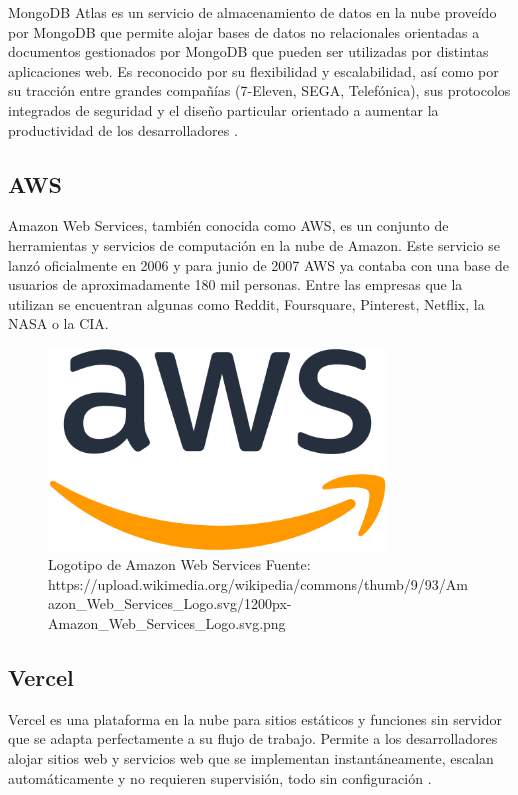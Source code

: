 MongoDB Atlas es un servicio de almacenamiento de datos en la nube proveído por MongoDB que permite alojar bases de datos no relacionales orientadas a documentos gestionados por MongoDB que pueden ser utilizadas por distintas aplicaciones web. Es reconocido por su flexibilidad y escalabilidad, así como por su tracción entre grandes compañías (7-Eleven, SEGA, Telefónica),  sus protocolos integrados de seguridad y el diseño particular orientado a aumentar la productividad de los desarrolladores \cite{mongodbAtlas}.

\subsection{AWS}

Amazon Web Services, también conocida como AWS, es un conjunto de herramientas y servicios de computación en la nube de Amazon. Este servicio se lanzó oficialmente en 2006 y para junio de 2007 AWS ya contaba con una base de usuarios de aproximadamente 180 mil personas. Entre las empresas que la utilizan se encuentran algunas como Reddit, Foursquare, Pinterest, Netflix, la NASA o la CIA.

\begin{figure}[H]
\centering
\includegraphics[width=0.80\textwidth]{img/11.png}
\caption{Logotipo de Amazon Web Services
Fuente: https://upload.wikimedia.org/wikipedia/commons/thumb/9/93/Amazon_Web_Services_Logo.svg/1200px-Amazon_Web_Services_Logo.svg.png}
\label{figure:AwsLogo}
\end{figure}


\subsection{Vercel}

Vercel es una plataforma en la nube para sitios estáticos y funciones sin servidor que se adapta perfectamente a su flujo de trabajo. Permite a los desarrolladores alojar sitios web y servicios web que se implementan instantáneamente, escalan automáticamente y no requieren supervisión, todo sin configuración \cite{vercel}.






